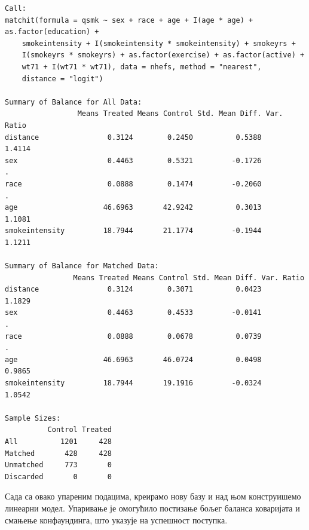 \documentclass[12pt, a4paper]{article}
\begin{document}
\begin{lstlisting}
Call:
matchit(formula = qsmk ~ sex + race + age + I(age * age) + as.factor(education) + 
    smokeintensity + I(smokeintensity * smokeintensity) + smokeyrs + 
    I(smokeyrs * smokeyrs) + as.factor(exercise) + as.factor(active) + 
    wt71 + I(wt71 * wt71), data = nhefs, method = "nearest", 
    distance = "logit")

Summary of Balance for All Data:
                 Means Treated Means Control Std. Mean Diff. Var. Ratio
distance                0.3124        0.2450          0.5388     1.4114
sex                     0.4463        0.5321         -0.1726          .
race                    0.0888        0.1474         -0.2060          .
age                    46.6963       42.9242          0.3013     1.1081
smokeintensity         18.7944       21.1774         -0.1944     1.1211

Summary of Balance for Matched Data:
                Means Treated Means Control Std. Mean Diff. Var. Ratio
distance                0.3124        0.3071          0.0423     1.1829
sex                     0.4463        0.4533         -0.0141          .
race                    0.0888        0.0678          0.0739          .
age                    46.6963       46.0724          0.0498     0.9865
smokeintensity         18.7944       19.1916         -0.0324     1.0542

Sample Sizes:
          Control Treated
All          1201     428
Matched       428     428
Unmatched     773       0
Discarded       0       0
\end{lstlisting}

Сада са овако упареним подацима, креирамо нову базу и над њом конструишемо линеарни модел. Упаривање је омогућило постизање бољег баланса коваријата и смањење конфаундинга, што указује на успешност поступка. %


\end{document}
